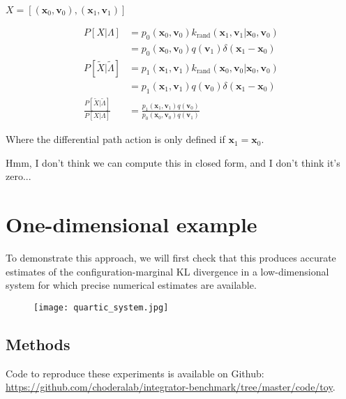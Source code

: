 \documentclass[11pt]{article}
\newcommand{\x}{\mathbf{x}}
\newcommand{\vel}{\mathbf{v}}
\begin{document}
$X = [ (\x_0, \vel_0), (\x_1, \vel_1)]$

$$\begin{aligned}
P[X | \Lambda] &= p_0(\x_0, \vel_0) k_\text{rand}(\x_1, \vel_1 | \x_0, \vel_0)\\
&= p_0(\x_0, \vel_0) q(\vel_1) \delta(\x_1 - \x_0)\\
P[\tilde{X} | \tilde{\Lambda}] &= p_1(\x_1, \vel_1) k_\text{rand}(\x_0, \vel_0 | \x_0, \vel_0)\\
&= p_1(\x_1, \vel_1) q(\vel_0) \delta(\x_1 - \x_0)\\
\frac{P[\tilde{X} | \tilde{\Lambda}] }{P[X | \Lambda]} &= \frac{p_1(\x_1, \vel_1) q(\vel_0)}{p_0(\x_0, \vel_0) q(\vel_1)}
\end{aligned}$$

Where the differential path action is only defined if $\x_1 = \x_0$.

Hmm, I don't think we can compute this in closed form, and I don't think it's zero...

\section{One-dimensional example}
To demonstrate this approach, we will first check that this produces accurate estimates of the configuration-marginal KL divergence in a low-dimensional system for which precise numerical estimates are available.

\begin{figure}[h]
	\centering
	\texttt{[image: quartic\_system.jpg]}
\end{figure}

\subsection{Methods}
Code to reproduce these experiments is available on Github: \url{https://github.com/choderalab/integrator-benchmark/tree/master/code/toy}.
\end{document}
